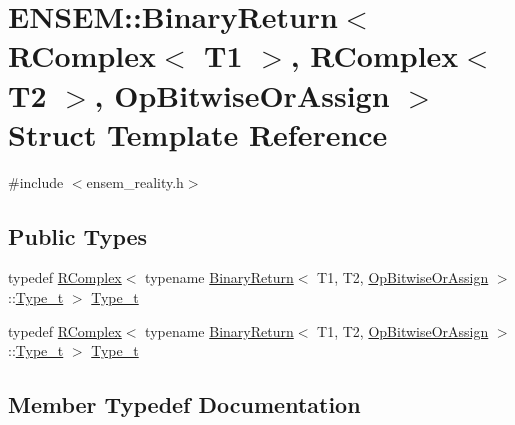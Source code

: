 \hypertarget{structENSEM_1_1BinaryReturn_3_01RComplex_3_01T1_01_4_00_01RComplex_3_01T2_01_4_00_01OpBitwiseOrAssign_01_4}{}\section{E\+N\+S\+EM\+:\+:Binary\+Return$<$ R\+Complex$<$ T1 $>$, R\+Complex$<$ T2 $>$, Op\+Bitwise\+Or\+Assign $>$ Struct Template Reference}
\label{structENSEM_1_1BinaryReturn_3_01RComplex_3_01T1_01_4_00_01RComplex_3_01T2_01_4_00_01OpBitwiseOrAssign_01_4}


{\ttfamily \#include $<$ensem\+\_\+reality.\+h$>$}

\subsection*{Public Types}
\begin{DoxyCompactItemize}
\item 
typedef \mbox{\hyperlink{classENSEM_1_1RComplex}{R\+Complex}}$<$ typename \mbox{\hyperlink{structENSEM_1_1BinaryReturn}{Binary\+Return}}$<$ T1, T2, \mbox{\hyperlink{structENSEM_1_1OpBitwiseOrAssign}{Op\+Bitwise\+Or\+Assign}} $>$\+::\mbox{\hyperlink{structENSEM_1_1BinaryReturn_3_01RComplex_3_01T1_01_4_00_01RComplex_3_01T2_01_4_00_01OpBitwiseOrAssign_01_4_afc125f612f2e10cb2ab894e459a7f90a}{Type\+\_\+t}} $>$ \mbox{\hyperlink{structENSEM_1_1BinaryReturn_3_01RComplex_3_01T1_01_4_00_01RComplex_3_01T2_01_4_00_01OpBitwiseOrAssign_01_4_afc125f612f2e10cb2ab894e459a7f90a}{Type\+\_\+t}}
\item 
typedef \mbox{\hyperlink{classENSEM_1_1RComplex}{R\+Complex}}$<$ typename \mbox{\hyperlink{structENSEM_1_1BinaryReturn}{Binary\+Return}}$<$ T1, T2, \mbox{\hyperlink{structENSEM_1_1OpBitwiseOrAssign}{Op\+Bitwise\+Or\+Assign}} $>$\+::\mbox{\hyperlink{structENSEM_1_1BinaryReturn_3_01RComplex_3_01T1_01_4_00_01RComplex_3_01T2_01_4_00_01OpBitwiseOrAssign_01_4_afc125f612f2e10cb2ab894e459a7f90a}{Type\+\_\+t}} $>$ \mbox{\hyperlink{structENSEM_1_1BinaryReturn_3_01RComplex_3_01T1_01_4_00_01RComplex_3_01T2_01_4_00_01OpBitwiseOrAssign_01_4_afc125f612f2e10cb2ab894e459a7f90a}{Type\+\_\+t}}
\end{DoxyCompactItemize}


\subsection{Member Typedef Documentation}
\mbox{\label{structENSEM_1_1BinaryReturn_3_01RComplex_3_01T1_01_4_00_01RComplex_3_01T2_01_4_00_01OpBitwiseOrAssign_01_4_afc125f612f2e10cb2ab894e459a7f90a}} 
